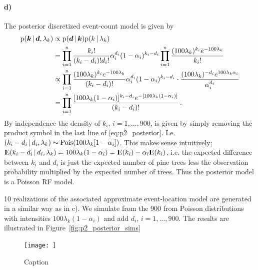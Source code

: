 \paragraph{d)}
The posterior discretized  event-count model is given by
%
\begin{align}
\label{eq:p2_posterior}
    \mathrm{p}(\bm{k} \, | \, \bm{d}, \lambda_k) &\propto \mathrm{p}(\bm{d} \, | \, \bm{k}) \mathrm{p}(k \, | \, \lambda_k) \\
    &= \prod_{i=1}^n \frac{k_i!}{(k_i - d_i)!d_i!} \alpha_i^{d_i} (1 - \alpha_i)^{k_i - d_i} \prod_{i=1}^n \frac{(100\lambda_k)^{k_i} e^{-100\lambda_k}}{k_i!} \\
    &\propto \prod_{i=1}^n \frac{(100\lambda_k)^{k_i} e^{-100\lambda_k}}{(k_i - d_i)!} \alpha_i^{d_i} (1 - \alpha_i)^{k_i - d_i} \cdot \frac{(100\lambda_k)^{-d_i} e^{100\lambda_k\alpha_i}}{\alpha_i^{d_i}} \\
    &= \prod_{i=1}^n \frac{[100\lambda_k(1-\alpha_i)]^{k_i-d_i} e^{-[100\lambda_k(1-\alpha_i)]}}{(k_i-d_i)!} \, .
\end{align}
%
By independence the density of $k_i$, $i = 1, \dots, 900$, is given by simply removing the product symbol in the last line of \eqref{eq:p2_posterior}. I.e. $(k_i - d_i \, | \, d_i, \lambda_k) \sim \mathrm{Pois}(100\lambda_k[1-\alpha_i])$. This makes sense intuitively; ${\rm I\kern-.3em E}(k_i - d_i \, | \, d_i, \lambda_k) = 100\lambda_k(1-\alpha_i) = {\rm I\kern-.3em E}(k_i) - \alpha_i{\rm I\kern-.3em E}(k_i)$, i.e. the expected difference between $k_i$ and $d_i$ is just the expected number of pine trees less the observation probability multiplied by the expected number of trees. Thus the posterior model is a Poisson RF model.

10 realizations of the associated approximate event-location model are generated in a similar way as in c). We simulate from the 900 from Poisson distributions with intensities $100\lambda_k(1-\alpha_i)$ and add $d_i$, $i = 1, \dots, 900$. The results are illustrated in Figure~\ref{fig:p2_posterior_sims}

\begin{figure}
    \centering
    \texttt{[image: ]}
    \caption{Caption}
    \label{fig:my_label}
\end{figure}
